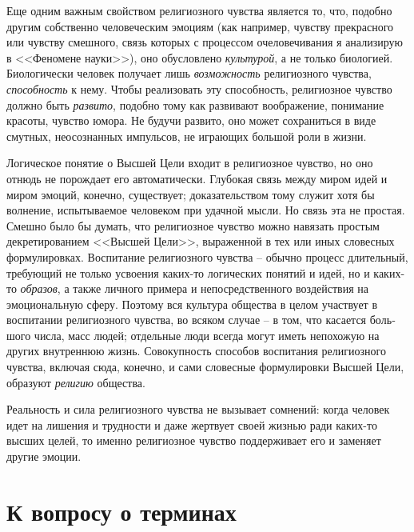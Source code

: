 \documentclass{book}
\begin{document}
Еще одним важным свойством религиозного чувства являет­ся то, что, подобно другим собственно человеческим эмоциям (как например, чувству прекрасного или чувству смешного, связь которых с процессом очеловечивания я анализирую в <<Феномене науки>>), оно обусловлено \textit{культурой},  а не только биологией. Биологически человек получает лишь \textit{возможность} религиозного чувства, \textit{способность}  к нему. Чтобы реализовать эту способность, религиозное чувство должно быть \textit{развито}, подобно тому как развивают воображение, понимание красоты, чувство юмора. Не будучи развито, оно может сохраниться в виде смутных, неосознанных импульсов, не играющих большой роли в жизни.

Логическое понятие о Высшей Цели входит в религиозное чувство, но оно отнюдь не порождает его автоматически. Глубокая связь между миром идей и миром эмоций, конечно, существует; доказательством тому служит хотя бы волнение, испытываемое человеком при удачной мысли. Но связь эта не простая. Смешно было бы думать, что религиозное чувство можно навязать простым декретированием <<Высшей Цели>>, выраженной в тех или иных словесных формулировках. Воспитание религиозного чувства -- обычно процесс длительный, требующий не только усвоения каких-то логических понятий и идей, но и каких-то \textit{образов},  а также личного примера и непосредственного воздействия на эмоциональную сферу. Поэтому вся культура общества в целом участвует в воспитании религиозного чувства, во всяком случае -- в том, что касается боль­шого числа, масс людей; отдельные люди всегда могут иметь непохожую на других внутреннюю жизнь. Совокупность способов воспитания религиозного чувства, включая сюда, конечно, и сами словесные формулировки Высшей 
Цели, 
образуют \textit{рели­гию}  общества.

Реальность и сила религиозного чувства не вызывает сомне­ний: когда человек идет на лишения и трудности и даже жертвует своей жизнью ради каких-то высших целей, то именно религиозное чувство поддерживает его и заменяет другие эмоции.


\section{К вопросу о терминах}
\end{document}

